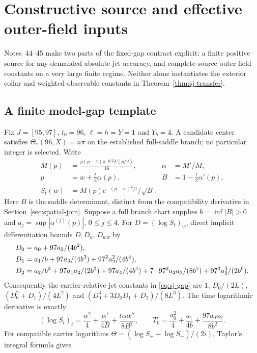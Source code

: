 \section{Constructive source and effective outer-field inputs}\label{sec:effective-inputs}
Notes~44--45 \cite{n44,n45} make two parts of the fixed-gap contract
explicit: a finite positive source for any demanded absolute jet accuracy,
and complete-source outer field constants on a very large finite regime.
Neither alone instantiates the exterior collar and weighted-observable
constants in Theorem~\ref{thm:sj-transfer}.

\subsection{A finite model-gap template}
Fix $J=[95,97]$, $t_0=96$, $\ell=h=Y=1$ and $Y_b=4$. A candidate
center satisfies $\Theta_*(96,X)=n\pi$ on the established full-saddle
branch; no particular integer is selected. Write
\begin{align*}
 M(p)&=\frac{p(p-1)\pi^{-p/2}\Gamma(p/2)}{16},&
 \alpha&=M'/M,\\
 p&=w+\tfrac t2\alpha(p),&B&=1-\tfrac t2\alpha'(p),\\
 S_t(w)&=M(p)e^{-(p-w)^2/t}/\sqrt B.
\end{align*}
Here $B$ is the saddle determinant, distinct from the compatibility
derivative in Section~\ref{sec:spatial-join}. Suppose a full branch chart
supplies $b=\inf|B|>0$ and $a_j=\sup|\alpha^{(j)}(p)|$, $0\le j\le4$.
For $D=(\log S_t)_w$, direct implicit differentiation bounds
$D,D_w,D_{ww}$ by
\begin{align}
 D_0&=a_0+97a_2/(4b^2),\notag\\
 D_1&=a_1/b+97a_3/(4b^3)+97^2a_2^2/(4b^4),\notag\\
 D_2&=a_2/b^2+97a_1a_2/(2b^3)+97a_4/(4b^4)
                  +7\cdot97^2a_2a_3/(8b^5)+97^3a_2^3/(2b^6).
 \label{eq:fi-model-caps}
\end{align}
Consequently the carrier-relative jet constants in
\eqref{eq:sj-gap} are $1$, $D_0/(2L)$,
$(D_0^2+D_1)/(4L^2)$ and $(D_0^3+3D_0D_1+D_2)/(8L^3)$.
The time logarithmic derivative is exactly
\begin{equation}
 (\log S_t)_t=\frac{\alpha^2}{4}+\frac{\alpha'}{4B}
                            +\frac{t\alpha\alpha''}{8B^2},\qquad
 T_0=\frac{a_0^2}{4}+\frac{a_1}{4b}+\frac{97a_0a_2}{8b^2}.
 \label{eq:fi-time-cap}
\end{equation}
For compatible carrier logarithms
$\Theta=(\log S_+-\log S_-)/(2i)$, Taylor's integral formula gives

